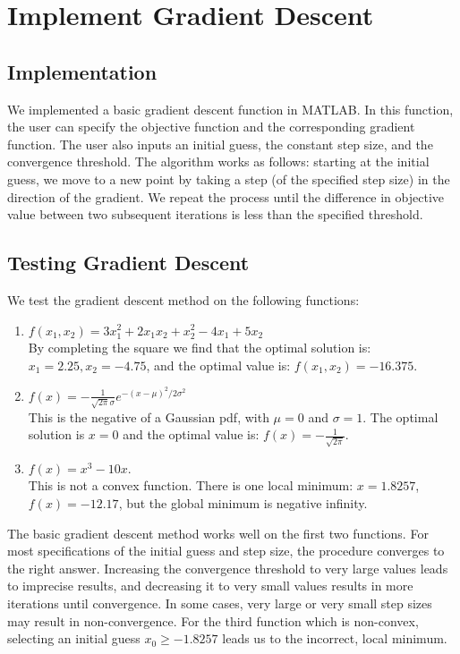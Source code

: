 
\section{Implement Gradient Descent}\label{sec:grad_desc}

\subsection{Implementation}
We implemented a basic gradient descent function in MATLAB. In this function, the user can specify the objective function and the corresponding gradient function. The user also inputs an initial guess, the constant step size, and the convergence threshold.  The algorithm works as follows: starting at the initial guess, we move to a new point by taking a step (of the specified step size) in the direction of the gradient. We repeat the process until the difference in objective value between two subsequent iterations is less than the specified threshold.

\subsection{Testing Gradient Descent}
We test the gradient descent method on the following functions:
\begin{enumerate}
\item $f(x_1, x_2) = 3x_1^2 + 2x_1x_2 + x_2^2 - 4x_1 + 5x_2$ \\
	By completing the square we find that the optimal solution is: $x_1 = 2.25, x_2 = -4.75$, and the optimal value is: $f(x_1, x_2) = -16.375$.
\item $f(x) = -\frac{1}{\sqrt{2\pi}\sigma}e^{-(x-\mu)^2/2\sigma^2}$ \\
	This is the negative of a Gaussian pdf, with $\mu = 0$ and $\sigma = 1$.  The optimal solution is $x = 0$ and the optimal value is: $f(x) = -\frac{1}{\sqrt{2\pi}}$.
\item $f(x) = x^3 - 10x$.\\
	This is not a convex function.  There is one local minimum: $x = 1.8257$, $f(x) = -12.17$, but the global minimum is negative infinity.
\end{enumerate}

The basic gradient descent method works well on the first two functions. For most specifications of the initial guess and step size, the procedure converges to the right answer. Increasing the convergence threshold to very large values leads to imprecise results, and decreasing it to very small values results in more iterations until convergence. In some cases, very large or very small step sizes may result in non-convergence. For the third function which is non-convex, selecting an initial guess $x_0 \geq -1.8257$ leads us to the incorrect, local minimum.  

